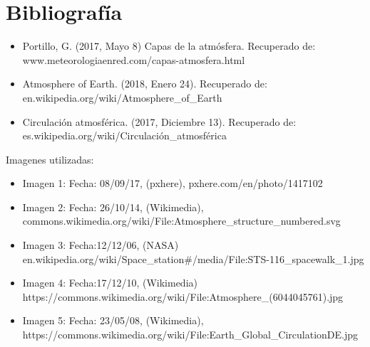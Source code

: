 \documentclass{article} %
\begin{document}
\section {Bibliografía}

\begin{itemize}
    \item Portillo, G. (2017, Mayo 8) Capas de la atmósfera. Recuperado de: www.meteorologiaenred.com/capas-atmosfera.html
    \item Atmosphere of Earth. (2018, Enero 24). Recuperado de: en.wikipedia.org/wiki/Atmosphere\_of\_Earth
    \item Circulación atmosférica. (2017, Diciembre 13). Recuperado de:
es.wikipedia.org/wiki/Circulación\_atmosférica \\
\end{itemize}

Imagenes utilizadas: 
\begin{itemize}
    \item Imagen 1: Fecha: 08/09/17, (pxhere), pxhere.com/en/photo/1417102
    \item Imagen 2: Fecha: 26/10/14, (Wikimedia), commons.wikimedia.org/wiki/File:Atmosphere\_structure\_numbered.svg
    \item Imagen 3: Fecha:12/12/06, (NASA) en.wikipedia.org/wiki/Space\_station\#/media/File:STS-116\_spacewalk\_1.jpg
        \item Imagen 4: Fecha:17/12/10, (Wikimedia) https://commons.wikimedia.org/wiki/File:Atmosphere\_(6044045761).jpg
    \item Imagen 5: Fecha: 23/05/08, (Wikimedia), https://commons.wikimedia.org/wiki/File:Earth\_Global\_Circulation\-DE.jpg

\end{itemize}
\end{document}
